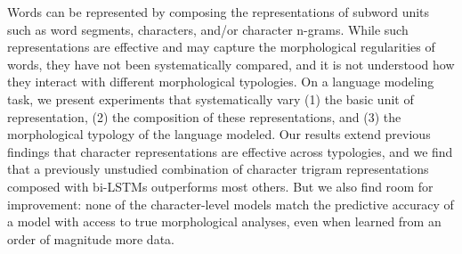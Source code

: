 Words can be represented by composing the representations of subword units such as word segments, characters, and/or character n-grams. While such representations are effective and may capture the morphological regularities of words, they have not been systematically compared, and it is not understood how they interact with different morphological typologies. On a language modeling task, we present experiments that systematically vary (1) the basic unit of representation, (2) the composition of these representations, and (3) the morphological typology of the language modeled. Our results extend previous findings that character representations are effective across typologies, and we find that a previously unstudied combination of character trigram representations composed with bi-LSTMs outperforms most others. But we also find room for improvement: none of the character-level models match the predictive accuracy of a model with access to true morphological analyses, even when learned from an order of magnitude more data.
